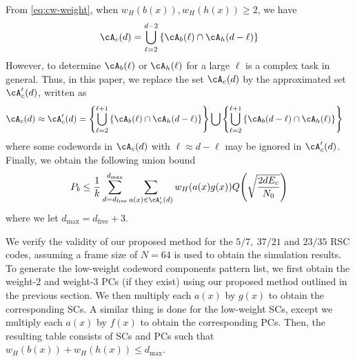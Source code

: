 From \eqref{eq:cw-weight}, when $w_H(b(x)), w_H(h(x)) \geq 2$, we have
\begin{align}
\cA_c(d) = \bigcup_{\ell = 2}^{d-2} \left\{\cA_b(\ell) \cap \cA_h(d-\ell)\right\}
\label{Eq:exactset}
\end{align}
However, to determine $\cA_b(\ell)$ or $\cA_h(\ell)$ for a large $\ell$ is a complex task in general. Thus, in this paper, we replace the set $\cA_c(d)$ by the approximated set $\cA_c'(d)$, written as %
\begin{equation}
\begin{split}
\cA_c(d) \approx \cA_c'(d) &= \left\{\bigcup_{\ell = 2}^{\ell+1} \left\{\cA_b(\ell) \cap \cA_h(d-\ell)\right\}\right\}\bigcup \left\{\bigcup_{\ell = 2}^{\ell+1} \left\{\cA_b(d-\ell) \cap \cA_h(\ell)\right\}\right\}
\end{split}
\label{setApprox}
\end{equation}
where some codewords in $\cA_c(d)$ with $\ell \approx d-\ell$ may be ignored in $\cA_c'(d)$.
Finally, we obtain the following union bound
\begin{align}
P_b \leq \frac{1}{k} \sum_{d=d_{\text{free}}}^{d_{\text{max}}} \sum_{a(x) \in \cA'_c(d)}w_H(a(x)g(x)) Q\Bigg( \sqrt{\frac{2dE_c}{N_0}}\Bigg)
\label{novelEq7}
\end{align}
where we let $d_{\text{max}}=d_{\text{free}}+3$. 


We verify the validity of our proposed method for the $5/7,~37/21$ and $23/35$ RSC codes, assuming a frame size of $N=64$ is used to obtain the simulation results. To generate the low-weight codeword components pattern list, we first obtain the weight-2 and weight-3 PCs (if they exist) using our proposed method outlined in the previous section. We then multiply each $a(x)$ by $g(x)$ to obtain the corresponding SCs. A similar thing is done for the low-weight SCs, except we multiply each $a(x)$ by $f(x)$ to obtain the corresponding PCs. Then, the resulting table consists of SCs and PCs such that $w_H(b(x))+w_H(h(x)) \leq d_{\text{max}}$.

